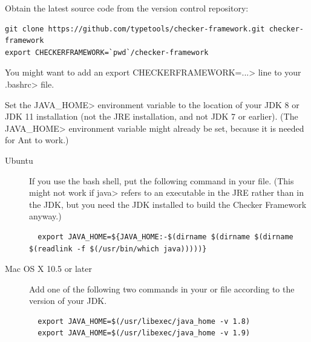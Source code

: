 
Obtain the latest source code from the version control repository:

\begin{Verbatim}
git clone https://github.com/typetools/checker-framework.git checker-framework
export CHECKERFRAMEWORK=`pwd`/checker-framework
\end{Verbatim}

You might want to add an \<export CHECKERFRAMEWORK=...> line to your
\<.bashrc> file.

Set the \<JAVA\_HOME> environment variable to the location of your JDK
8 or JDK 11 installation (not the JRE installation, and not JDK 7 or earlier).
(The \<JAVA\_HOME> environment
variable might already be set, because it is needed for Ant to work.)

\begin{description}
\item[Ubuntu]
If you use the bash shell, put the following command in your
 file.  (This might not work if \<java> refers to an executable
in the JRE rather than in the JDK, but you need the JDK installed to build
the Checker Framework anyway.)
\begin{smaller}
\begin{Verbatim}
  export JAVA_HOME=${JAVA_HOME:-$(dirname $(dirname $(dirname $(readlink -f $(/usr/bin/which java)))))}
\end{Verbatim}
\end{smaller}

\item[Mac OS X 10.5 or later]
  Add one of the following two commands in your  or
   file according to the version of your JDK.
\begin{Verbatim}
  export JAVA_HOME=$(/usr/libexec/java_home -v 1.8)
  export JAVA_HOME=$(/usr/libexec/java_home -v 1.9)
\end{Verbatim}

\end{description}


